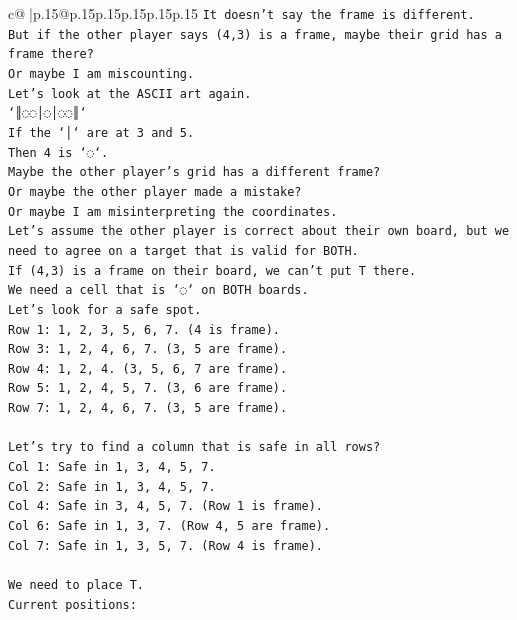 \documentclass{article}
\begin{document}
{\begin{supertabular}{c@{$\;$}|p{.15\linewidth}@{}p{.15\linewidth}p{.15\linewidth}p{.15\linewidth}p{.15\linewidth}p{.15\linewidth}}
{{{\texttt{It doesn't say the frame is different.} \\
\texttt{But if the other player says (4,3) is a frame, maybe their grid has a frame there?} \\
\texttt{Or maybe I am miscounting.} \\
\texttt{Let's look at the ASCII art again.} \\
\texttt{`║◌◌│◌│◌◌║`} \\
\texttt{If the `│` are at 3 and 5.} \\
\texttt{Then 4 is `◌`.} \\
\texttt{Maybe the other player's grid has a different frame?} \\
\texttt{Or maybe the other player made a mistake?} \\
\texttt{Or maybe I am misinterpreting the coordinates.} \\
\texttt{Let's assume the other player is correct about their own board, but we need to agree on a target that is valid for BOTH.} \\
\texttt{If (4,3) is a frame on their board, we can't put T there.} \\
\texttt{We need a cell that is `◌` on BOTH boards.} \\
\texttt{Let's look for a safe spot.} \\
\texttt{Row 1: 1, 2, 3, 5, 6, 7. (4 is frame).} \\
\texttt{Row 3: 1, 2, 4, 6, 7. (3, 5 are frame).} \\
\texttt{Row 4: 1, 2, 4. (3, 5, 6, 7 are frame).} \\
\texttt{Row 5: 1, 2, 4, 5, 7. (3, 6 are frame).} \\
\texttt{Row 7: 1, 2, 4, 6, 7. (3, 5 are frame).} \\
\\ 
\texttt{Let's try to find a column that is safe in all rows?} \\
\texttt{Col 1: Safe in 1, 3, 4, 5, 7.} \\
\texttt{Col 2: Safe in 1, 3, 4, 5, 7.} \\
\texttt{Col 4: Safe in 3, 4, 5, 7. (Row 1 is frame).} \\
\texttt{Col 6: Safe in 1, 3, 7. (Row 4, 5 are frame).} \\
\texttt{Col 7: Safe in 1, 3, 5, 7. (Row 4 is frame).} \\
\\ 
\texttt{We need to place T.} \\
\texttt{Current positions:} \\
}}}
\end{supertabular}}
\end{document}

